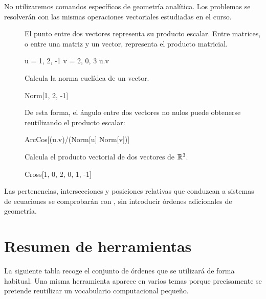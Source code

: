 No utilizaremos comandos específicos de geometría analítica. Los problemas se resolverán con las mismas operaciones vectoriales estudiadas en el curso.

\begin{description}

\item[] El punto entre dos vectores representa su producto escalar. Entre matrices, o entre una matriz y un vector, representa el producto matricial.
\begin{mathematicacode}
u = {1, 2, -1}
v = {2, 0, 3}
u.v
\end{mathematicacode}

\item[] Calcula la norma euclídea de un vector.
\begin{mathematicacode}
Norm[{1, 2, -1}]
\end{mathematicacode}
De esta forma, el ángulo entre dos vectores no nulos puede obtenerse reutilizando el producto escalar:
\begin{mathematicacode}
ArcCos[(u.v)/(Norm[u] Norm[v])]
\end{mathematicacode}

\item[] Calcula el producto vectorial de dos vectores de $\mathbb{R}^3$.
\begin{mathematicacode}
Cross[{1, 0, 2}, {0, 1, -1}]
\end{mathematicacode}

\end{description}

Las pertenencias, intersecciones y posiciones relativas que conduzcan a sistemas de ecuaciones se comprobarán con , sin introducir órdenes adicionales de geometría.

\section*{Resumen de herramientas}

La siguiente tabla recoge el conjunto de órdenes que se utilizará de forma habitual. Una misma herramienta aparece en varios temas porque precisamente se pretende reutilizar un vocabulario computacional pequeño.

